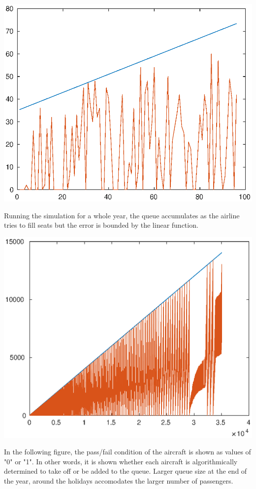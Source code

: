 \documentclass[12pt]{article}
\begin{document}
\includegraphics{linPF_01.eps}

Running the simulation for a whole year, the queue accumulates as the airline tries to fill seats but the error is bounded by the linear function.

\includegraphics{linPF_02.eps}

In the following figure, the pass/fail condition of the aircraft is shown as values of "0" or "1". In other words, it is shown whether each aircraft is algorithmically determined to take off or be added to the queue. Larger queue size at the end of the year, around the holidays accomodates the larger number of passengers.
\end{document}
